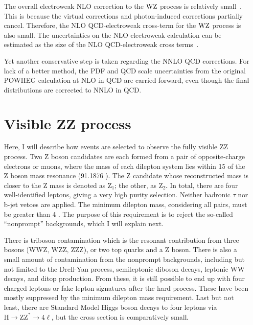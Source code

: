 The overall electroweak NLO correction to the $\mathrm{W}\mathrm{Z}$ process is relatively small~\cite{Bierweiler:2013dja,Gieseke:2014gka,Baglio:113005}.
This is because the virtual corrections and photon-induced corrections partially cancel.
Therefore, the NLO QCD-electroweak cross-term for the $\mathrm{W}\mathrm{Z}$ process is also small.
The uncertainties on the NLO electroweak calculation can be estimated as the size of the NLO QCD-electroweak cross terms~\cite{Manohar:2016nzj,Alwall:2014hca,Frixione:2014qaa,Frixione:2015zaa}.


Yet another conservative step is taken regarding the NNLO QCD corrections.
For lack of a better method, the PDF and QCD scale uncertainties from the original POWHEG calculation at NLO in QCD are carried forward,
even though the final distributions are corrected to NNLO in QCD.

\clearpage
\section{Visible ZZ process}
\label{sec:zz4l}
Here, I will describe how events are selected to observe the fully visible ZZ process.
Two Z boson candidates are each formed from a pair of opposite-charge electrons or muons, where the mass of each dilepton system lies within 15 \GeV of the Z boson mass resonance (91.1876 \GeV).
The Z candidate whose reconstructed mass is closer to the Z mass is denoted as $\mathrm{Z}_1$; the other, as $\mathrm{Z}_2$.
In total, there are four well-identified leptons, giving a very high purity selection.
Neither hadronic $\tau$ nor b-jet vetoes are applied.
The minimum dilepton mass, considering all pairs, must be greater than 4 \GeV.
The purpose of this requirement is to reject the so-called ``nonprompt'' backgrounds, which I will explain next.

There is triboson contamination which is the resonant contribution from three bosons (WWZ, WZZ, ZZZ), or two top quarks and a Z boson.
There is also a small amount of contamination from the nonprompt backgrounds,
including but not limited to the Drell-Yan process, semileptonic diboson decays, leptonic WW decays, and ditop production.
From these, it is still possible to end up with four charged leptons or fake lepton signatures after the hard process.
These have been mostly suppressed by the minimum dilepton mass requirement.
Last but not least, there are Standard Model Higgs boson decays to four leptons
via $\mathrm{H}\rightarrow \mathrm{ZZ^*} \rightarrow 4\ell$, 
but the cross section is comparatively small.

